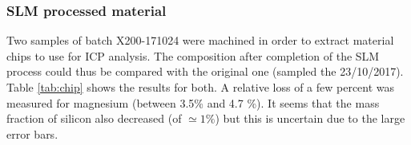  \begin{center}
\begin{table}[ht]
\noindent{}

\caption[Composition of recycled AlSi10Mg powder as a function of the date]{Composition of recycled AlSi10Mg powder as a function of the date}
\label{tab:compo}
\end{table}
 \end{center}

\subsubsection{SLM processed material}

Two samples of batch X200-171024 were machined in order to extract material chips to use for ICP analysis. The composition after completion of the SLM process could thus  be compared with the original one (sampled the 23/10/2017). Table \ref{tab:chip} shows the results for both. A relative loss of a few percent was measured for magnesium (between 3.5\% and 4.7 \%). It seems that the mass fraction of silicon also decreased (of $\simeq 1\%$) but this is uncertain due to the large error bars. \\

